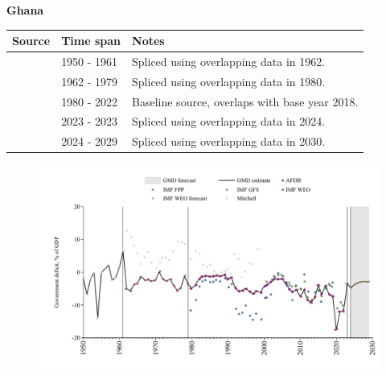 \documentclass[12pt,a4paper,landscape]{article}
\begin{document}
\begin{adjustbox}{max totalsize={\paperwidth}{\paperheight},center}
\begin{minipage}[t][\textheight][t]{\textwidth}
\vspace*{0.5cm}
{}
\begin{center}
{\Large\bfseries Ghana}
\end{center}
\vspace{0.5cm}
\begin{table}[H]
\centering
\small
\begin{tabular}{|l|l|l|}
\hline
\textbf{Source} & \textbf{Time span} & \textbf{Notes} \\
\hline
\rowcolor{white}\cite{Mitchell}& 1950 - 1961 &Spliced using overlapping data in 1962.\\
\rowcolor{lightgray}\cite{IMF_FPP}& 1962 - 1979 &Spliced using overlapping data in 1980.\\
\rowcolor{white}\cite{IMF_WEO}& 1980 - 2022 &Baseline source, overlaps with base year 2018.\\
\rowcolor{lightgray}\cite{IMF_FPP}& 2023 - 2023 &Spliced using overlapping data in 2024.\\
\rowcolor{white}\cite{IMF_WEO_forecast}& 2024 - 2029 &Spliced using overlapping data in 2030.\\
\hline
\end{tabular}
\end{table}
\begin{figure}[H]
\centering
\includegraphics[width=\textwidth,height=0.6\textheight,keepaspectratio]{graphs/GHA_govdef_GDP.pdf}
\end{figure}
\end{minipage}
\end{adjustbox}
\end{document}
